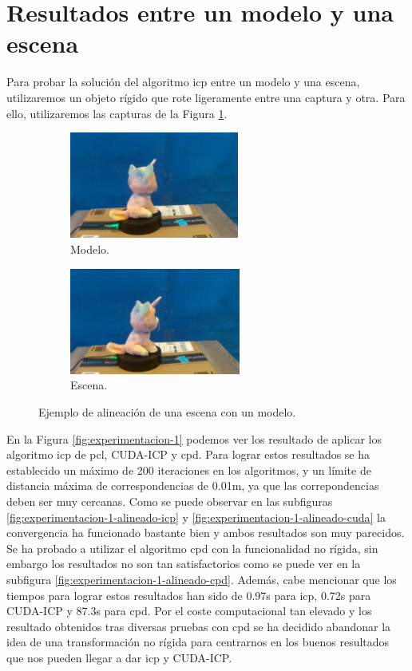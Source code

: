 \section{Resultados entre un modelo y una escena}

Para probar la solución del algoritmo \gls{icp} entre un modelo y una escena, utilizaremos un objeto rígido que rote ligeramente entre una captura y otra.
Para ello, utilizaremos las capturas de la Figura \ref{fig:objetos-experimentacion-modelo-escena}.

\begin{figure}[h]
    \centering
    \begin{subfigure}[t]{0.33\textheight}
    	\centering
        \includegraphics[height=3.5cm]{archivos/experimentacion-modelo.png}
        \caption{Modelo.}
    \end{subfigure}
    \begin{subfigure}[t]{0.33\textheight}
    	\centering
        \includegraphics[height=3.5cm]{archivos/experimentacion-escena.png}
        \caption{Escena.}
    \end{subfigure}
    \caption{Ejemplo de alineación de una escena con un modelo.}
    \label{fig:objetos-experimentacion-modelo-escena}
\end{figure}

En la Figura \ref{fig:experimentacion-1} podemos ver los resultado de aplicar los algoritmo \gls{icp} de \gls{pcl}, CUDA-ICP y \gls{cpd}.
Para lograr estos resultados se ha establecido un máximo de 200 iteraciones en los algoritmos, y un límite de distancia máxima de correspondencias de 0.01m, ya que las correpondencias deben ser muy cercanas.
Como se puede observar en las subfiguras \ref{fig:experimentacion-1-alineado-icp} y \ref{fig:experimentacion-1-alineado-cuda} la convergencia ha funcionado bastante bien y ambos resultados son muy parecidos.
Se ha probado a utilizar el algoritmo \gls{cpd} con la funcionalidad no rígida, sin embargo los resultados no son tan satisfactorios como se puede ver en la subfigura \ref{fig:experimentacion-1-alineado-cpd}.
Además, cabe mencionar que los tiempos para lograr estos resultados han sido de 0.97s para \gls{icp}, 0.72s para CUDA-ICP y 87.3s para \gls{cpd}.
Por el coste computacional tan elevado y los resultado obtenidos tras diversas pruebas con \gls{cpd} se ha decidido abandonar la idea de una transformación no rígida para centrarnos en los buenos resultados que nos pueden llegar a dar \gls{icp} y CUDA-ICP.

